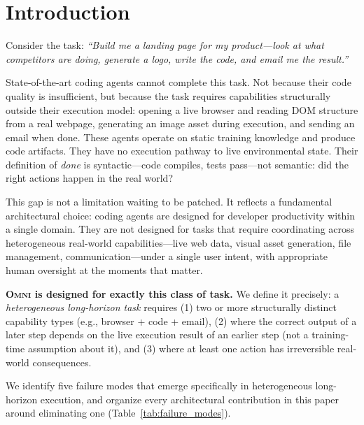 \documentclass[11pt,a4paper]{article}
\newcommand{\omni}{\textsc{Omni}}
\begin{document}
\section{Introduction}
\label{sec:intro}

Consider the task: \emph{``Build me a landing page for my product---look at what competitors are doing, generate a logo, write the code, and email me the result.''}

State-of-the-art coding agents cannot complete this task. Not because their code quality is insufficient, but because the task requires capabilities structurally outside their execution model: opening a live browser and reading DOM structure from a real webpage, generating an image asset during execution, and sending an email when done. These agents operate on static training knowledge and produce code artifacts. They have no execution pathway to live environmental state. Their definition of \emph{done} is syntactic---code compiles, tests pass---not semantic: did the right actions happen in the real world?

This gap is not a limitation waiting to be patched. It reflects a fundamental architectural choice: coding agents are designed for developer productivity within a single domain. They are not designed for tasks that require coordinating across heterogeneous real-world capabilities---live web data, visual asset generation, file management, communication---under a single user intent, with appropriate human oversight at the moments that matter.

\textbf{\omni{} is designed for exactly this class of task.} We define it precisely: a \emph{heterogeneous long-horizon task} requires (1) two or more structurally distinct capability types (e.g., browser + code + email), (2) where the correct output of a later step depends on the live execution result of an earlier step (not a training-time assumption about it), and (3) where at least one action has irreversible real-world consequences.

We identify five failure modes that emerge specifically in heterogeneous long-horizon execution, and organize every architectural contribution in this paper around eliminating one (Table~\ref{tab:failure_modes}).
\end{document}

